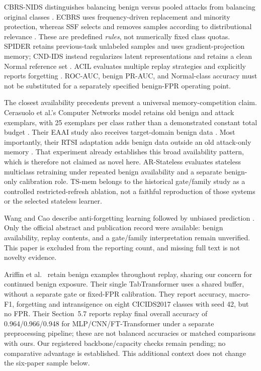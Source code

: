\documentclass[10pt,twocolumn]{article}
\begin{document}
CBRS-NIDS distinguishes balancing benign versus pooled attacks from balancing original classes \citep{cbrs}. ECBRS uses frequency-driven replacement and minority protection, whereas SSF selects and removes samples according to distributional relevance \citep{ecbrs,ssf}. These are predefined \emph{rules}, not numerically fixed class quotas. SPIDER retains previous-task unlabeled samples and uses gradient-projection memory; CND-IDS instead regularizes latent representations and retains a clean Normal reference set \citep{spider,cndids}. ACIL evaluates multiple replay strategies and explicitly reports forgetting \citep{acil}. ROC-AUC, benign PR-AUC, and Normal-class accuracy must not be substituted for a separately specified benign-FPR operating point.

The closest availability precedents prevent a universal memory-competition claim. Cerasuolo et al.'s Computer Networks model retains old benign and attack exemplars, with 25 exemplars per class rather than a demonstrated constant total budget \citep{cerasuolo_comnet}. Their EAAI study also receives target-domain benign data \citep{cerasuolo_eaai}. Most importantly, their RTSI adaptation adds benign data outside an old attack-only memory \citep{cerasuolo_rtsi}. That experiment already establishes this broad availability pattern, which is therefore not claimed as novel here. AR-Stateless evaluates stateless multiclass retraining under repeated benign availability and a separate benign-only calibration role. TS-mem belongs to the historical gate/family study as a controlled restricted-refresh ablation, not a faithful reproduction of those systems or the selected stateless learner.

Wang and Cao describe anti-forgetting learning followed by unbiased prediction \citep{wangcao}. Only the official abstract and publication record were available: benign availability, replay contents, and a gate/family interpretation remain unverified. This paper is excluded from the reporting count, and missing full text is not novelty evidence.

Ariffin et al.\ \citep{ariffin2026replayids} retain benign examples throughout replay, sharing our concern for continued benign exposure. Their single TabTransformer uses a shared buffer, without a separate gate or fixed-FPR calibration. They report accuracy, macro-F1, forgetting and intransigence on eight CICIDS2017 classes with seed 42, but no FPR. Their Section~5.7 reports replay final overall accuracy of 0.964/0.966/0.948 for MLP/CNN/FT-Transformer under a separate preprocessing pipeline; these are not balanced accuracies or matched comparisons with ours. Our registered backbone/capacity checks remain pending; no comparative advantage is established. This additional context does not change the six-paper sample below.
\end{document}

